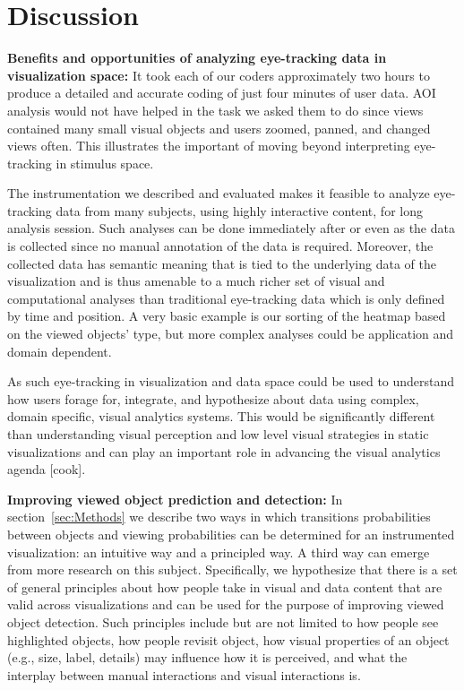 \section{Discussion}

\textbf{Benefits and opportunities of analyzing eye-tracking data in visualization space:} It took each of our coders approximately two hours to produce a detailed and accurate coding of just four minutes of user data. AOI analysis would not have helped in the task we asked them to do since views contained many small visual objects and users zoomed, panned, and changed views often. This illustrates the important of moving beyond interpreting eye-tracking in stimulus space.

The instrumentation we described and evaluated makes it feasible to analyze eye-tracking data from many subjects, using highly interactive content, for long analysis session. Such analyses can be done immediately after or even as the data is collected since no manual annotation of the data is required. Moreover, the collected data has semantic meaning that is tied to the underlying data of the visualization and is thus amenable to a much richer set of visual and computational analyses than traditional eye-tracking data which is only defined by time and position. A very basic example is our sorting of the heatmap based on the viewed objects' type, but more complex analyses could be application and domain dependent.

As such eye-tracking in visualization and data space could be used to understand how users forage for, integrate, and hypothesize about data using complex, domain specific, visual analytics systems. This would be significantly different than understanding visual perception and low level visual strategies in static visualizations and can play an important role in advancing the visual analytics agenda [cook]. 

\textbf{Improving viewed object prediction and detection:} In section~\ref{sec:Methods} we describe two ways in which transitions probabilities between objects and viewing probabilities can be determined for an instrumented visualization: an intuitive way and a principled way. A third way can emerge from more research on this subject. Specifically, we hypothesize that there is a set of general principles about how people take in visual and data content that are valid across visualizations and can be used for the purpose of improving viewed object detection. Such principles include but are not limited to how people see highlighted objects, how people revisit object, how visual properties of an object (e.g., size, label, details) may influence how it is perceived, and what the interplay between manual interactions and visual interactions is.

